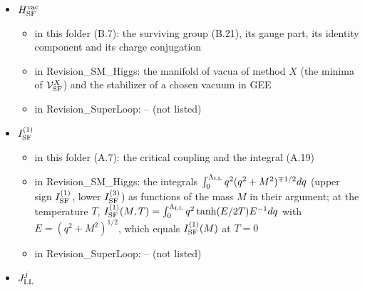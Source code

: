 \documentclass[
  10pt,
]{article}
\providecommand{\tightlist}{%
  \setlength{\itemsep}{0pt}\setlength{\parskip}{0pt}}
\begin{document}
\begin{itemize}
  \begin{itemize}
  \tightlist
  \item
    in this folder (B.7, D): the spin connection of GEE, the gauge field
    of its \(SL(2,\mathbb C)\) factor; in a curved space-time
    \(\tfrac14\omega^{\rm LG}_{\mu\,ab}\gamma^{ab}_{\rm LL}\) (14.7)
  \item
    in Revision\_SM\_Higgs: the Lorentz connection, for each direction
    \(p\) a Lorentz generator, and the spin connection
    \(\Gamma^{\rm LL}_p=\mathsf s_{\rm LL}(\mathbf u^\omega_{{\rm LL},p})\otimes\sigma^{\rm LL}_0\)
    (on flat M31 a pure gauge, zero in the canonical frame)
  \item
    in Revision\_SuperLoop: the spin connection, the \(8\times8\) matrix
    \(\Gamma^{\rm LL}_p=\mathsf s_{\rm LL}(\mathbf u^\omega_{{\rm LL},p})\otimes\sigma^{\rm LL}_0\)
    (it acts on the Dirac index and leaves the isospin index alone)
  \end{itemize}
\item
  \(H^{\rm vac}_{\rm SF}\)

  \begin{itemize}
  \tightlist
  \item
    in this folder (B.7): the surviving group (B.21), its gauge part,
    its identity component and its charge conjugation
  \item
    in Revision\_SM\_Higgs: the manifold of vacua of method \(X\) (the
    minima of \(\mathcal V^X_{\rm SF}\)) and the stabilizer of a chosen
    vacuum in GEE
  \item
    in Revision\_SuperLoop: -- (not listed)
  \end{itemize}
\item
  \(I^{(1)}_{\rm SF}\)

  \begin{itemize}
  \tightlist
  \item
    in this folder (A.7): the critical coupling and the integral (A.19)
  \item
    in Revision\_SM\_Higgs: the integrals
    \(\int_0^{\Lambda_{\rm LL}}q^2(q^2+M^2)^{\mp1/2}dq\) (upper sign
    \(I^{(1)}_{\rm SF}\), lower \(I^{(3)}_{\rm SF}\)) as functions of
    the mass \(M\) in their argument; at the temperature \(T\),
    \(I^{(1)}_{\rm SF}(M,T)=\int_0^{\Lambda_{\rm LL}}q^2\tanh(E/2T)E^{-1}dq\)
    with \(E=(q^2+M^2)^{1/2}\), which equals \(I^{(1)}_{\rm SF}(M)\) at
    \(T=0\)
  \item
    in Revision\_SuperLoop: -- (not listed)
  \end{itemize}
\item
  \(J^j_{\rm LL}\)


\end{itemize}
\end{document}

